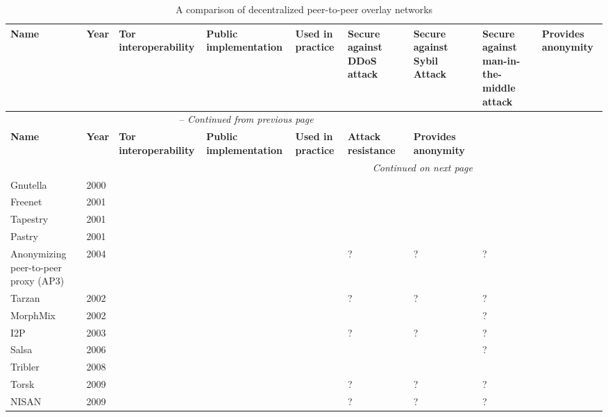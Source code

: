 \begin{center}
    \begin{longtable}{ | p{1.9cm} | p{0.8cm} | p{1.6cm} | p{2.2cm} | p{2.2cm} | p{2.5cm} | p{2.5cm} | p{2.5cm} | p{2cm} | }
  		\caption{A comparison of decentralized peer-to-peer overlay networks} \\ \hline
	    \textbf{Name} & \textbf{Year} & \textbf{Tor interoperability} & \textbf{Public implementation} & \textbf{Used in practice} & \textbf{Secure against DDoS attack} & \textbf{Secure against Sybil Attack} & \textbf{Secure against man-in-the-middle attack} & \textbf{Provides anonymity} \\ \hline
		\endfirsthead
		\multicolumn{7}{c}{\tablename\ \thetable\ -- \textit{Continued from previous page}} \\ \hline
	    \textbf{Name} & \textbf{Year} & \textbf{Tor interoperability} & \textbf{Public implementation} & \textbf{Used in practice} & \textbf{Attack resistance} & \textbf{Provides anonymity} \\ \hline
		\endhead
		\hline \multicolumn{7}{r}{\textit{Continued on next page}} \\
		\endfoot
		\hline
		\endlastfoot
	    
		Gnutella & 2000 & \xmark & \checkmark & \checkmark & \xmark & \xmark & \xmark & \xmark \\ \hline
		Freenet & 2001 & \xmark & \checkmark & \checkmark & \checkmark & \xmark & \xmark & \checkmark \\ \hline
		Tapestry & 2001 & \xmark & \checkmark & \checkmark & \checkmark & \xmark & \xmark & \xmark \\ \hline
		Pastry & 2001 & \xmark & \checkmark & \checkmark & \checkmark & \xmark & \xmark & \xmark \\ \hline
		Anonymizing peer-to-peer proxy (AP3) & 2004 & \xmark & \xmark & \xmark & ? & ? & ? & \checkmark \\ \hline
		Tarzan & 2002 & \xmark & \xmark & \xmark & ? & ? & ? & \checkmark \\ \hline
		MorphMix & 2002 & \xmark & \checkmark & \xmark & \checkmark & \xmark & ? & \checkmark \\ \hline
		I2P & 2003 & \xmark & \checkmark & \checkmark & ? & ? & ? & \checkmark\\ \hline
		Salsa & 2006 & \xmark & \xmark & \xmark & \checkmark & \checkmark & ? & \checkmark \\ \hline
		Tribler & 2008 & \xmark & \checkmark & \checkmark & \checkmark & \xmark & \xmark & \xmark \\ \hline
		Torsk & 2009 & \checkmark & \xmark & \xmark & ? & ? & ? & \checkmark \\ \hline
		NISAN & 2009 & \xmark & \xmark & \xmark & ? & ? & ? & \checkmark \\ \hline
    \end{longtable}
\end{center}